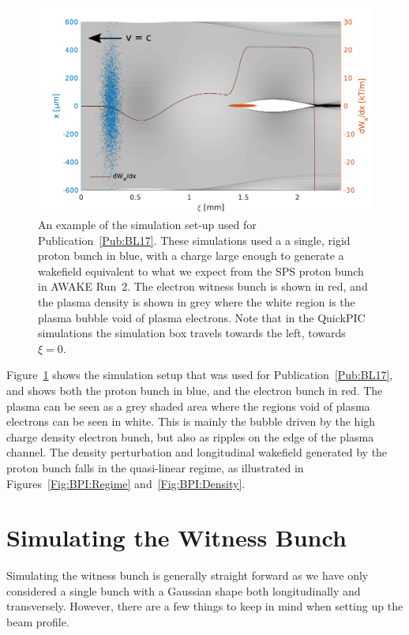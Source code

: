 \begin{figure}[hbt]
    \centering
    \includegraphics[width=0.8125\linewidth,trim={0mm 0mm 0mm 0mm},clip]{figures/SingleBunchPB}
    \caption{\label{Fig:PBSingle}
        An example of the simulation set-up used for Publication~\ref{Pub:BL17}.
        These simulations used a a single, rigid proton bunch in blue, with a charge large enough to generate a wakefield equivalent to what we expect from the SPS proton bunch in AWAKE Run~2.
        The electron witness bunch is shown in red, and the plasma density is shown in grey where the white region is the plasma bubble void of plasma electrons.
        Note that in the QuickPIC simulations the simulation box travels towards the left, towards $\xi = 0$.
    }
\end{figure}

Figure~\ref{Fig:PBSingle} shows the simulation setup that was used for Publication~\ref{Pub:BL17}, and shows both the proton bunch in blue, and the electron bunch in red.
The plasma can be seen as a grey shaded area where the regions void of plasma electrons can be seen in white.
This is mainly the bubble driven by the high charge density electron bunch, but also as ripples on the edge of the plasma channel.
The density perturbation and longitudinal wakefield generated by the proton bunch falls in the quasi-linear regime, as illustrated in Figures~\ref{Fig:BPI:Regime} and~\ref{Fig:BPI:Density}.

\section{Simulating the Witness Bunch}
\label{Sim:EBeam}

Simulating the witness bunch is generally straight forward as we have only considered a single bunch with a Gaussian shape both longitudinally and transversely.
However, there are a few things to keep in mind when setting up the beam profile.

